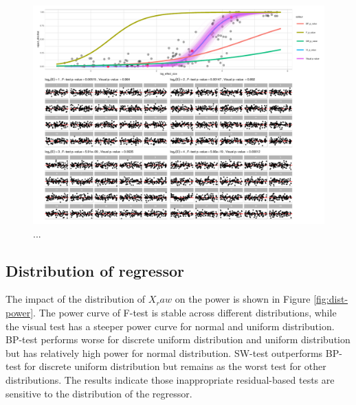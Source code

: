 \documentclass[]{interact}
\theoremstyle{plain}%
\theoremstyle{definition}
\theoremstyle{remark}
\begin{document}
\begin{figure}

{\centering \includegraphics[width=1\linewidth]{paper_comparison_files/figure-latex/fig:power-poly-uniform-1} 

}

\caption{...}\label{fig:fig:power-poly-uniform}
\end{figure}

\hypertarget{distribution-of-regressor}{%
\subsection{Distribution of regressor}\label{distribution-of-regressor}}

The impact of the distribution of \(X_raw\) on the power is shown in
Figure \ref{fig:dist-power}. The power curve of F-test is stable across
different distributions, while the visual test has a steeper power curve
for normal and uniform distribution. BP-test performs worse for discrete
uniform distribution and uniform distribution but has relatively high
power for normal distribution. SW-test outperforms BP-test for discrete
uniform distribution but remains as the worst test for other
distributions. The results indicate those inappropriate residual-based
tests are sensitive to the distribution of the regressor.
\end{document}
